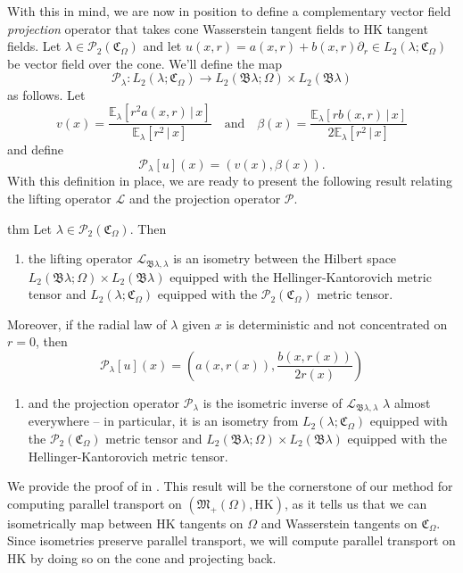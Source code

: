 \documentclass[11pt]{article}
\begin{document}
\noindent With this in mind, we are now in position to define a complementary vector field \textit{projection} operator that takes cone Wasserstein tangent fields to HK tangent fields. Let $\lambda \in \mathcal{P}_2(\mathfrak{C}_\Omega)$ and let $u(x,r) = a(x,r) + b(x,r)\partial_r \in L_2(\lambda; \mathfrak{C}_\Omega)$ be vector field over the cone. We'll define the map  
\[\mathcal{P}_{\lambda}: L_2(\lambda; \mathfrak{C}_\Omega) \rightarrow L_2(\mathfrak{B}\lambda; \Omega) \times L_2(\mathfrak{B}\lambda) \]
as follows. Let 
\[v(x) = \frac{\mathbb{E}_\lambda[r^2a(x,r) \,|\, x]}{\mathbb{E}_\lambda[r^2 \,| \,x]} \quad \text{and} \quad \beta(x) = \frac{\mathbb{E}_\lambda[rb(x,r) \, | \, x]}{2\mathbb{E}_\lambda[r^2 \, | \, x]}\]
and define
\[\mathcal{P}_\lambda[u](x) = (v(x), \beta(x)).\]
With this definition in place, we are ready to present the following result relating the lifting operator $\mathcal{L}$ and the projection operator $\mathcal{P}.$
\begin{restatable}{thm}{} \label{isometry}
    Let $\lambda \in \mathcal{P}_2(\mathfrak{C}_\Omega).$ Then
    \begin{enumerate}[label=(\alph*)]
        \item the lifting operator $\mathcal{L}_{\mathfrak{B}\lambda, \lambda}$ is an isometry between the Hilbert space $L_2(\mathfrak{B}\lambda; \Omega) \times L_2(\mathfrak{B}\lambda)$ equipped with the Hellinger-Kantorovich metric tensor and $L_2(\lambda; \mathfrak{C}_\Omega)$ equipped with the $\mathcal{P}_2(\mathfrak{C}_\Omega)$ metric tensor.
    \end{enumerate}  Moreover, if the radial law of $\lambda$ given $x$ is deterministic and not concentrated on $r = 0$, then 
    \[\mathcal{P}_\lambda[u](x) = \left(a(x, r(x)), \frac{b(x, r(x))}{2r(x)}\right)\]
    \begin{enumerate}[resume*]
        \item and the projection operator $\mathcal{P}_\lambda$ is the isometric inverse of $\mathcal{L}_{\mathfrak{B}\lambda, \lambda}$ $\lambda$ almost everywhere -- in particular, it is an isometry from $L_2(\lambda; \mathfrak{C}_\Omega)$ equipped with the $\mathcal{P}_2(\mathfrak{C}_\Omega)$ metric tensor and $L_2(\mathfrak{B}\lambda; \Omega) \times L_2(\mathfrak{B}\lambda)$ equipped with the Hellinger-Kantorovich metric tensor. 
    \end{enumerate}
\end{restatable}
We provide the proof of  in . This result will be the cornerstone of our method for computing parallel transport on $(\mathfrak{M}_+(\Omega), \text{HK})$, as it tells us that we can isometrically map between HK tangents on $\Omega$ and Wasserstein tangents on $\mathfrak{C}_\Omega$. Since isometries preserve parallel transport, we will compute parallel transport on HK by doing so on the cone and projecting back.
\end{document}

